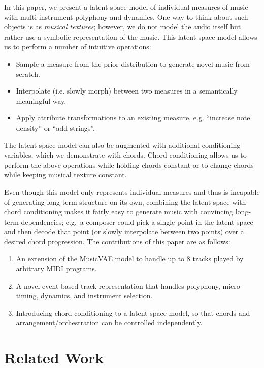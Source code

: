 \documentclass{article}
\begin{document}
In this paper, we present a latent space model of individual measures of music with multi-instrument polyphony and dynamics.  One way to think about such objects is as {\it musical textures}; however, we do not model the audio itself but rather use a symbolic representation of the music.  This latent space model allows us to perform a number of intuitive operations:
\begin{itemize}[nolistsep]%
\item Sample a measure from the prior distribution to generate novel music from scratch.
\item Interpolate (i.e. slowly morph) between two measures in a semantically meaningful way.
\item Apply attribute transformations to an existing measure, e.g. ``increase note density'' or ``add strings''.
\end{itemize}
The latent space model can also be augmented with additional conditioning variables, which we demonstrate with chords.  Chord conditioning allows us to perform the above operations while holding chords constant or to change chords while keeping musical texture constant.

Even though this model only represents individual measures and thus is incapable of generating long-term structure on its own, combining the latent space with chord conditioning makes it fairly easy to generate music with convincing long-term dependencies; e.g.\ a composer could pick a single point in the latent space and then decode that point (or slowly interpolate between two points) over a desired chord progression.  The contributions of this paper are as follows:
\begin{enumerate}[nolistsep]%
    \item An extension of the MusicVAE model \cite{roberts2018hierarchical} to handle up to 8 tracks played by arbitrary MIDI programs.
    \item A novel event-based track representation that handles polyphony, micro-timing, dynamics, and instrument selection.
    \item Introducing chord-conditioning to a latent space model, so that chords and arrangement/orchestration can be controlled independently.
\end{enumerate}


%
\section{Related Work}
\end{document}
